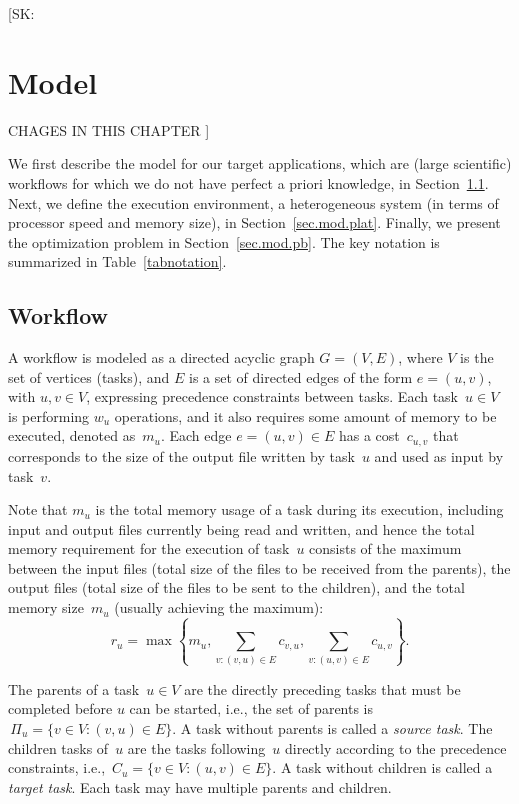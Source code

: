 \documentclass[conference]{IEEEtran}
\newcommand{\parents}[1]{\,\Pi_{#1}}
\newcommand{\children}[1]{\,C_{#1}}
\newcommand{\skug}[1]{{\color{blue}[SK: #1]}}
\begin{document}
\skug{
\section{Model} %
\label{sec:model}

CHAGES IN THIS CHAPTER
}
    We first describe the model for our target applications, which are (large scientific) workflows for which we do not have perfect a priori knowledge,
    in Section~\ref{sec.mod.work}.  Next, we define the execution
    environment, a heterogeneous system (in terms of processor speed and memory size),
    in Section~\ref{sec.mod.plat}. Finally, we present the optimization problem in
    Section~\ref{sec.mod.pb}. The key notation is summarized in Table~\ref{tabnotation}.

    \subsection{Workflow}
    \label{sec.mod.work}
    A workflow is modeled as a directed acyclic graph $G=(V, E)$, where $V$ is the set of vertices (tasks), and
    $E$ is a set of directed edges of the form $e=(u,v)$, with $u,v\in V$, expressing precedence constraints between tasks.
    Each task~$u \in V$  is performing $w_u$ operations, and it also
    requires some amount of memory to be executed, denoted as~$m_u$.
    Each edge $e=(u,v) \in E$ has a cost~$c_{u,v}$ that corresponds to the size of the output file written by task~$u$ and used as input by task~$v$.

    Note that $m_u$ is the total memory usage
    of a task during its execution, including input and output files currently being read and written,
    and hence the total memory requirement  for the execution of task~$u$ consists of the maximum
    between the input files
    (total size of the files to be received from the parents),
    the output files (total size of the files to be sent to the children),
    and the total memory size~$m_u$ (usually achieving the maximum):
    \[
        r_u = \max\left\{m_u , \sum_{v:(v,u)\in E}c_{v,u}, \sum_{v:(u,v)\in E} c_{u,v}\right\}.
    \]

    The parents of a task~$u\in V$ are the directly preceding tasks that must be completed before $u$ can be started, i.e., the set of parents is
    $ \parents{u} = \{v \in V: (v,u) \in E\}$. A task without parents is called a {\it source task}.
    The children tasks of~$u$ are the tasks following~$u$ directly according to the precedence constraints, i.e.,
    $ \children{u} = \{v \in V: (u,v) \in E\}$. A task without children is called a {\it target task}.
    Each task may have multiple parents and children.
\end{document}

